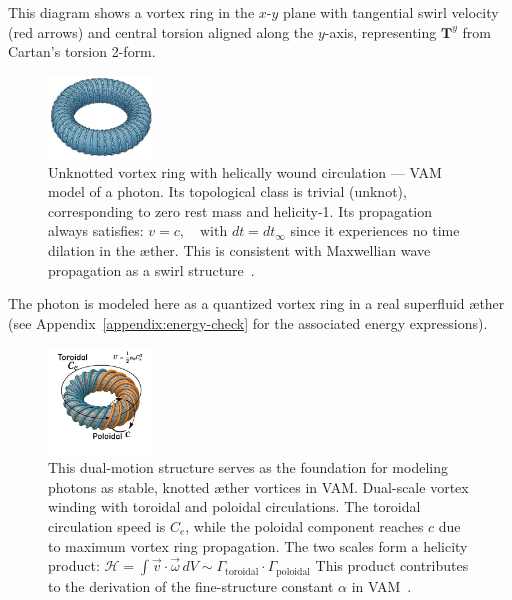 This diagram shows a vortex ring in the $x$-$y$ plane with tangential swirl velocity (red arrows) and central torsion aligned along the $y$-axis,
representing $\mathbf{T}^y$ from Cartan's torsion 2-form.

\begin{figure}[H]
    \centering
    \includegraphics[width=0.25\textwidth]{figures/Un-Knot}
    \caption{Unknotted vortex ring with helically wound circulation — VAM model of a photon. Its topological class is trivial (unknot), corresponding to zero rest mass and helicity-1. Its propagation always satisfies:
        \( v = c, \quad \text{with } dt = dt_{\infty} \)
        since it experiences no time dilation in the æther. This is consistent with Maxwellian wave propagation as a swirl structure~\cite{maxwell1875}.}
    \label{fig:un-knot}
\end{figure}


The photon is modeled here as a quantized vortex ring in a real superfluid æther (see Appendix~\ref{appendix:energy-check} for the associated energy expressions).

\begin{figure}[H]
    \centering
    \includegraphics[width=0.25\textwidth]{figures/vortex-fine-structure}
    \caption{
        This dual-motion structure serves as the foundation for modeling photons as stable, knotted æther vortices in VAM.
        Dual-scale vortex winding with toroidal and poloidal circulations. The toroidal circulation speed is $C_e$, while the poloidal component reaches $c$ due to maximum vortex ring propagation. The two scales form a helicity product:
        \(
            \mathcal{H} = \int \vec{v} \cdot \vec{\omega} \, dV \sim \Gamma_{\text{toroidal}} \cdot \Gamma_{\text{poloidal}}
        \)
        This product contributes to the derivation of the fine-structure constant $\alpha$ in VAM~\cite{iskandarani2025b}.
    }
    \label{fig:vortex-3d}
\end{figure}




